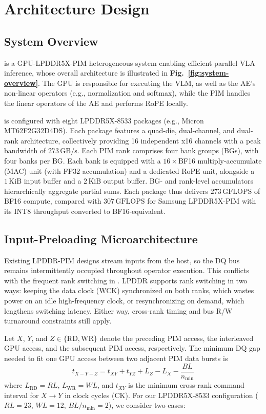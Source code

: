 \section{Architecture Design}
\label{sec:architecture}
\subsection{System Overview}
\label{sec:architecture-a}
\sys{} is a GPU-LPDDR5X-PIM heterogeneous system enabling efficient parallel VLA inference, whose overall architecture is illustrated in \textbf{Fig.~\ref{fig:system-overview}}. The GPU is responsible for executing the VLM, as well as the AE's non-linear operators (e.g., normalization and softmax), while the PIM handles the linear operators of the AE and performs RoPE locally.

\sys{} is configured with eight LPDDR5X-8533 packages (e.g., Micron MT62F2G32D4DS). Each package features a quad-die, dual-channel, and dual-rank architecture, collectively providing 16 independent x16 channels with a peak bandwidth of $273\,\mathrm{GB/s}$. Each PIM rank comprises four bank groups (BGs), with four banks per BG. Each bank is equipped with a $16\times$BF16 multiply-accumulate (MAC) unit (with FP32 accumulation) and a dedicated RoPE unit, alongside a $1\,\mathrm{KiB}$ input buffer and a $2\,\mathrm{KiB}$ output buffer. BG- and rank-level accumulators hierarchically aggregate partial sums. Each package thus delivers $273\,\mathrm{GFLOPS}$ of BF16 compute, compared with $307\,\mathrm{GFLOPS}$ for Samsung LPDDR5X-PIM with its INT8 throughput converted to BF16-equivalent.



\subsection{Input-Preloading Microarchitecture}
\label{sec:architecture-b}
Existing LPDDR-PIM designs stream inputs from the host, so the DQ bus remains intermittently occupied throughout operator execution. This conflicts with the frequent rank switching in \sys{}. LPDDR supports rank switching in two ways: keeping the data clock (WCK) synchronized on both ranks, which wastes power on an idle high-frequency clock, or resynchronizing on demand, which lengthens switching latency. Either way, cross-rank timing and bus R/W turnaround constraints still apply.

Let $X$, $Y$, and $Z\in\{\mathrm{RD},\mathrm{WR}\}$ denote the preceding PIM access, the interleaved GPU access, and the subsequent PIM access, respectively. The minimum DQ gap needed to fit one GPU access between two adjacent PIM data bursts is
\begin{equation}
t_{X-Y-Z}=t_{XY}+t_{YZ}+L_Z-L_X-\frac{BL}{n_{\min}}
\label{eq:pim-gpu-pim-gap}
\end{equation}
where $L_{\mathrm{RD}}=RL$, $L_{\mathrm{WR}}=WL$, and $t_{XY}$ is the minimum cross-rank command interval for $X\rightarrow Y$ in clock cycles (CK). For our LPDDR5X-8533 configuration ($RL=23$, $WL=12$, $BL/n_{\min}=2$), we consider two cases:

